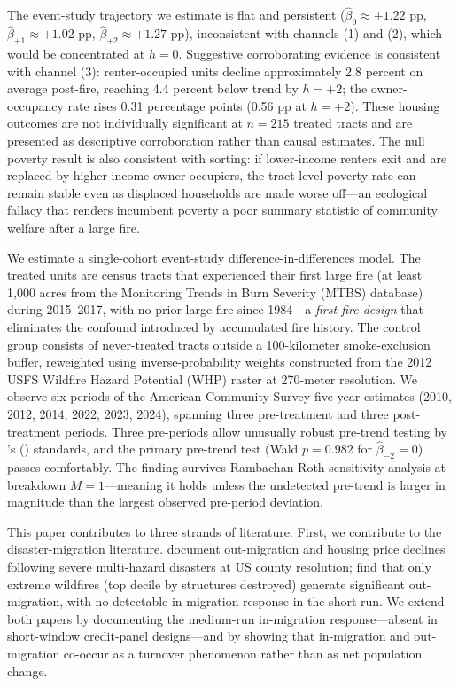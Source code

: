 \documentclass[12pt]{article}
\begin{document}
The event-study trajectory we estimate is flat and persistent
($\hat{\beta}_0 \approx +1.22$ pp, $\hat{\beta}_{+1} \approx +1.02$ pp,
$\hat{\beta}_{+2} \approx +1.27$ pp), inconsistent with channels (1)
and (2), which would be concentrated at $h = 0$.
Suggestive corroborating evidence is consistent with channel (3):
renter-occupied units decline approximately 2.8 percent on average
post-fire, reaching 4.4 percent below trend by $h = +2$;
the owner-occupancy rate rises 0.31 percentage points
(0.56 pp at $h = +2$).
These housing outcomes are not individually significant at $n = 215$
treated tracts and are presented as descriptive corroboration rather
than causal estimates.
The null poverty result is also consistent with sorting:
if lower-income renters exit and are replaced by higher-income
owner-occupiers, the tract-level poverty rate can remain stable even
as displaced households are made worse off---an ecological fallacy
that renders incumbent poverty a poor summary statistic of community
welfare after a large fire.

We estimate a single-cohort event-study difference-in-differences model.
The treated units are census tracts that experienced their first
large fire (at least 1,000 acres from the Monitoring Trends in Burn
Severity (MTBS) database) during 2015--2017, with no prior large fire
since 1984---a \emph{first-fire design} that eliminates the confound
introduced by accumulated fire history.
The control group consists of never-treated tracts outside a
100-kilometer smoke-exclusion buffer,
reweighted using inverse-probability weights constructed from the 2012
USFS Wildfire Hazard Potential (WHP) raster at 270-meter resolution.
We observe six periods of the American Community Survey five-year
estimates (2010, 2012, 2014, 2022, 2023, 2024),
spanning three pre-treatment and three post-treatment periods.
Three pre-periods allow unusually robust pre-trend testing by
\citeauthor{roth2022pretest}'s (\citeyear{roth2022pretest}) standards,
and the primary pre-trend test (Wald $p = 0.982$ for $\hat{\beta}_{-2} = 0$)
passes comfortably.
The finding survives Rambachan-Roth sensitivity analysis at breakdown
$M = 1$---meaning it holds unless the undetected pre-trend is larger in
magnitude than the largest observed pre-period deviation.

This paper contributes to three strands of literature.
First, we contribute to the disaster-migration literature.
\citet{boustan2020effect} document out-migration and housing price declines
following severe multi-hazard disasters at US county resolution;
\citet{mcconnell2024wildfire} find that only extreme wildfires
(top decile by structures destroyed) generate significant out-migration,
with no detectable in-migration response in the short run.
We extend both papers by documenting the medium-run in-migration
response---absent in short-window credit-panel designs---and by showing
that in-migration and out-migration co-occur as a turnover phenomenon
rather than as net population change.
\end{document}
